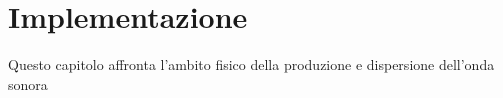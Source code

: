 
\chapter{Implementazione}
\label{chp:Implementazione}

Questo capitolo affronta l'ambito fisico della produzione e dispersione dell'onda sonora
